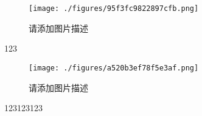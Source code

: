 
\begin{figure}[ht]
\centering
\texttt{[image: ./figures/95f3fc9822897cfb.png]}
\caption{请添加图片描述} \label{fig_testMg_5}
\end{figure}

123

\begin{figure}[ht]
\centering
\texttt{[image: ./figures/a520b3ef78f5e3af.png]}
\caption{请添加图片描述} \label{fig_testMg_4}
\end{figure}

123123123


